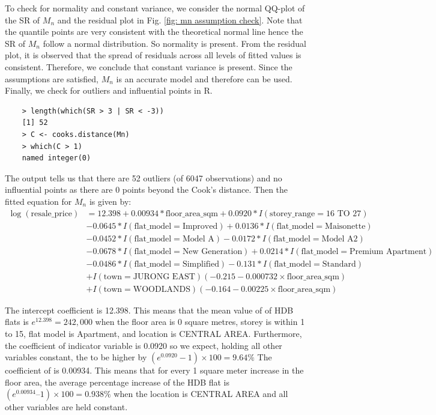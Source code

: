 To check for normality and constant variance, we consider the normal QQ-plot of the SR of $M_n$ and the residual plot in Fig. \ref{fig: mn assumption check}. Note that the quantile points are very consistent with the theoretical normal line hence the SR of $M_n$ follow a normal distribution. So normality is present. From the residual plot, it is observed that the spread of residuals across all levels of fitted values is consistent. Therefore, we conclude that constant variance is present. Since the assumptions are satisfied, $M_n$ is an accurate model and therefore can be used. Finally, we check for outliers and influential points in R.
\begin{verbatim}
    > length(which(SR > 3 | SR < -3))
    [1] 52
    > C <- cooks.distance(Mn)
    > which(C > 1)
    named integer(0)
\end{verbatim}
The output tells us that there are 52 outliers (of 6047 observations) and no influential points as there are 0 points beyond the Cook's distance. Then the fitted equation for $M_n$ is given by:
\begin{align*}
    \log(\text{resale\_price}) &= 12.398 + 0.00934 * \text{floor\_area\_sqm} + 0.0920 * I(\text{storey\_range} = \text{16 TO 27})\\
    &-0.0645 * I(\text{flat\_model} = \text{Improved}) + 0.0136 * I(\text{flat\_model} = \text{Maisonette}) \\
    &-0.0452 * I(\text{flat\_model} = \text{Model A}) - 0.0172 * I(\text{flat\_model} = \text{Model A2}) \\
    &-0.0678 * I(\text{flat\_model} = \text{New Generation}) + 0.0214 * I(\text{flat\_model} = \text{Premium Apartment}) \\
    &-0.0486 * I(\text{flat\_model} = \text{Simplified}) - 0.131 * I(\text{flat\_model} = \text{Standard}) \\
    &+ I(\text{town} = \text{JURONG EAST})(-0.215 - 0.000732 \times\text{floor\_area\_sqm}) \\
    &+ I(\text{town} = \text{WOODLANDS})(-0.164 - 0.00225 \times \text{floor\_area\_sqm})
\end{align*}

The intercept coefficient is 12.398. This means that the mean value of  of HDB flats is $e^{12.398} = 242,000$ when the floor area is 0 square metres, storey is within 1 to 15, flat model is Apartment, and location is CENTRAL AREA. Furthermore, the coefficient of indicator variable  is 0.0920 so we expect, holding all other variables constant, the  to be higher by $(e^{0.0920} - 1) \times 100 = 9.64\%$
The coefficient of  is 0.00934. This means that for every 1 square meter increase in the floor area, the average percentage increase of the HDB flat  is $(e^{0.00934} – 1) \times 100 = 0.938\%$ when the location is CENTRAL AREA and all other variables are held constant.
\\

